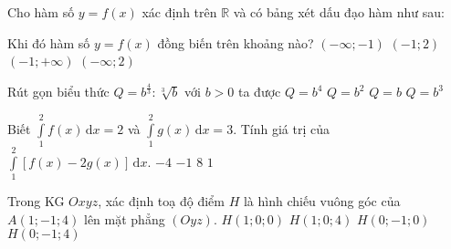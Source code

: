 \begin{ex}%
	Cho hàm số $y=f(x)$ xác định trên $\mathbb{R}$ và có bảng xét dấu đạo hàm như sau:
	\begin{center}
	\end{center}
	Khi đó hàm số $y=f(x)$ đồng biến trên khoảng nào?
	\choice
	{$(-\infty;-1)$}
	{\True $(-1;2)$}
	{$(-1;+\infty)$}
	{$(-\infty;2)$}
\end{ex}
\begin{ex}%
	Rút gọn biểu thức $Q=b^{\tfrac{4}{3}}:\sqrt[3]{b}$ với $b>0$ ta được
	\choice
	{$Q=b^4$}
	{$Q=b^2$}
	{\True $Q=b$}
	{$Q=b^3$}
\end{ex}
\begin{ex}%
	Biết $\displaystyle\int\limits_1^2 f(x) \mathrm{\,d}x=2$ và $\displaystyle\int\limits_1^2 g(x) \mathrm{\,d}x=3$. Tính giá trị của $\displaystyle\int\limits_1^2 \left[f(x)-2 g(x)\right] \mathrm{\,d}x$.
	\choice
	{\True $-4$}
	{$-1$}
	{$8$}
	{$1$}
\end{ex}
\begin{ex}%
	Trong KG $Oxyz$, xác định toạ độ điểm $H$ là hình chiếu vuông góc của $A(1;-1;4)$ lên mặt phẳng $(Oyz)$.
	\choice
	{$H(1;0;0)$}
	{$H(1;0;4)$}
	{$H(0;-1;0)$}
	{\True $H(0;-1;4)$}
\end{ex}
